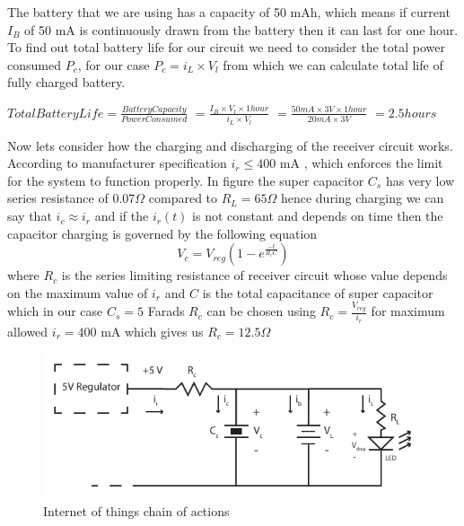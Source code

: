 The battery that we are using has a capacity of 50 mAh, which means if current $I_B$ of 50 mA  is continuously drawn from the battery then it can last for one hour. To find out total battery life for our circuit we need to consider the total power consumed $P_c$, for our case $P_c = i_L \times V_l $ from which we can calculate total life of fully charged battery.

 $Total Battery Life = \frac{Battery Capacity}{Power Consumed}$
                    $= \frac{I_B \times V_l \times 1 hour}{i_L \times V_l}$
                    $= \frac{50mA \times 3V \times 1 hour}{20mA \times 3V}$
                    $= 2.5 hours$


Now lets consider how the charging and discharging of the receiver circuit works. According to manufacturer specification $i_r \leq 400 $ mA , which enforces the limit for the system to function properly.
In figure %
the super capacitor $C_s$ has very low series resistance of $0.07 \Omega$ compared to $R_L = 65 \Omega$ hence during charging we can say that $i_c \approx i_r$ and if the $i_r(t)$ is not constant and depends on time then the capacitor charging is governed by the following equation
\begin{equation}\label{eq:cap}
 V_c = V_{reg} \left(1 - e^{\frac{-t}{R_cC}}\right)
\end{equation}
where $R_c$ is the series limiting resistance of receiver circuit whose value depends on the maximum value of $i_r$ and $C$ is the total capacitance of super capacitor which in our case $C_s = 5 $ Farads
$R_c$ can be chosen using $R_c = \frac { V_{reg}}{i_r} $ for maximum allowed $i_r = 400$ mA which gives us $R_c = 12.5 \Omega$

\begin{figure}[h!]
\centering
\includegraphics[width=1\textwidth]{rec_design.pdf}
\caption{Internet of things chain of actions}
\label{fig:rec_des}
\end{figure}


